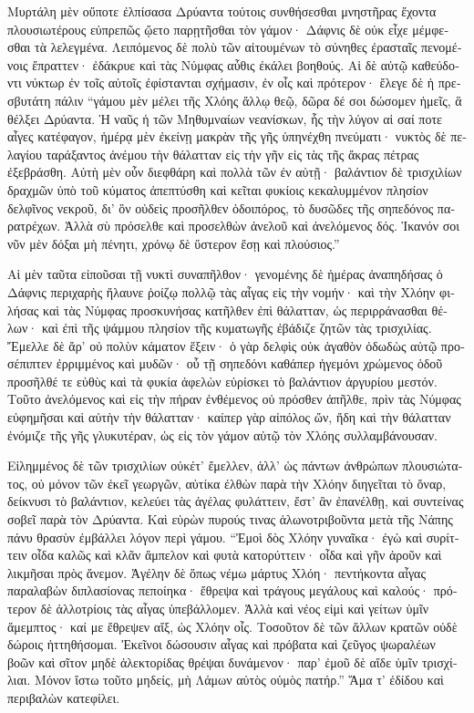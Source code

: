 \documentclass{book}
\begin{document}
\begin{pairs}
\begin{Leftside}
\begin{greek}
  Μυρτάλη μὲν οὔποτε ἐλπίσασα Δρύαντα τούτοις συνθήσεσθαι μνηστῆρας ἔχοντα πλουσιωτέρους εὐπρεπῶς ᾤετο παρῃτῆσθαι τὸν γάμον· Δάφνις δὲ οὐκ εἶχε μέμφεσθαι τὰ λελεγμένα. Λειπόμενος δὲ πολὺ τῶν αἰτουμένων τὸ σύνηθες ἐρασταῖς πενομένοις ἔπραττεν· ἐδάκρυε καὶ τὰς Νύμφας αὖθις ἐκάλει βοηθούς.  Αἱ δὲ αὐτῷ καθεύδοντι νύκτωρ ἐν τοῖς αὐτοῖς ἐφίστανται σχήμασιν, ἐν οἷς καὶ πρότερον· ἔλεγε δὲ ἡ πρεσβυτάτη πάλιν “γάμου μὲν μέλει τῆς Χλόης ἄλλῳ θεῷ, δῶρα δέ σοι δώσομεν ἡμεῖς, ἃ θέλξει Δρύαντα.  Ἡ ναῦς ἡ τῶν Μηθυμναίων νεανίσκων, ἧς τὴν λύγον αἱ σαί ποτε αἶγες κατέφαγον, ἡμέρᾳ μὲν ἐκείνῃ μακρὰν τῆς γῆς ὑπηνέχθη πνεύματι· νυκτὸς δὲ πελαγίου ταράξαντος ἀνέμου τὴν θάλατταν εἰς τὴν γῆν εἰς τὰς τῆς ἄκρας πέτρας ἐξεβράσθη.  Αὐτὴ μὲν οὖν διεφθάρη καὶ πολλὰ τῶν ἐν αὐτῇ· βαλάντιον δὲ τρισχιλίων δραχμῶν ὑπὸ τοῦ κύματος ἀπεπτύσθη καὶ κεῖται φυκίοις κεκαλυμμένον πλησίον δελφῖνος νεκροῦ, δι’ ὃν οὐδεὶς προσῆλθεν ὁδοιπόρος, τὸ δυσῶδες τῆς σηπεδόνος παρατρέχων.  Ἀλλὰ σὺ πρόσελθε καὶ προσελθὼν ἀνελοῦ καὶ ἀνελόμενος δός. Ἱκανόν σοι νῦν μὲν δόξαι μὴ πένητι, χρόνῳ δὲ ὕστερον ἔσῃ καὶ πλούσιος.”
\pend


  Αἱ μὲν ταῦτα εἰποῦσαι τῇ νυκτὶ συναπῆλθον· γενομένης δὲ ἡμέρας ἀναπηδήσας ὁ Δάφνις περιχαρὴς ἤλαυνε ῥοίζῳ πολλῷ τὰς αἶγας εἰς τὴν νομήν· καὶ τὴν Χλόην φιλήσας καὶ τὰς Νύμφας προσκυνήσας κατῆλθεν ἐπὶ θάλατταν, ὡς περιρράνασθαι θέλων· καὶ ἐπὶ τῆς ψάμμου πλησίον τῆς κυματωγῆς ἐβάδιζε ζητῶν τὰς τρισχιλίας.  Ἔμελλε δὲ ἄρ’ οὐ πολὺν κάματον ἕξειν· ὁ γὰρ δελφὶς οὐκ ἀγαθὸν ὀδωδὼς αὐτῷ προσέπιπτεν ἐρριμμένος καὶ μυδῶν· οὗ τῇ σηπεδόνι καθάπερ ἡγεμόνι χρώμενος ὁδοῦ προσῆλθέ τε εὐθὺς καὶ τὰ φυκία ἀφελὼν εὑρίσκει τὸ βαλάντιον ἀργυρίου μεστόν.  Τοῦτο ἀνελόμενος καὶ εἰς τὴν πήραν ἐνθέμενος οὐ πρόσθεν ἀπῆλθε, πρὶν τὰς Νύμφας εὐφημῆσαι καὶ αὐτὴν τὴν θάλατταν· καίπερ γὰρ αἰπόλος ὤν, ἤδη καὶ τὴν θάλατταν ἐνόμιζε τῆς γῆς γλυκυτέραν, ὡς εἰς τὸν γάμον αὐτῷ τὸν Χλόης συλλαμβάνουσαν.
\pend


  Εἰλημμένος δὲ τῶν τρισχιλίων οὐκέτ’ ἔμελλεν, ἀλλ’ ὡς πάντων ἀνθρώπων πλουσιώτατος, οὐ μόνον τῶν ἐκεῖ γεωργῶν, αὐτίκα ἐλθὼν παρὰ τὴν Χλόην διηγεῖται τὸ ὄναρ, δείκνυσι τὸ βαλάντιον, κελεύει τὰς ἀγέλας φυλάττειν, ἔστ’ ἂν ἐπανέλθῃ, καὶ συντείνας σοβεῖ παρὰ τὸν Δρύαντα. Καὶ εὑρὼν πυρούς τινας ἁλωνοτριβοῦντα μετὰ τῆς Νάπης πάνυ θρασὺν ἐμβάλλει λόγον περὶ γάμου.  “Ἐμοὶ δὸς Χλόην γυναῖκα· ἐγὼ καὶ συρίττειν οἶδα καλῶς καὶ κλᾶν ἄμπελον καὶ φυτὰ κατορύττειν· οἶδα καὶ γῆν ἀροῦν καὶ λικμῆσαι πρὸς ἄνεμον. Ἀγέλην δὲ ὅπως νέμω μάρτυς Χλόη· πεντήκοντα αἶγας παραλαβὼν διπλασίονας πεποίηκα· ἔθρεψα καὶ τράγους μεγάλους καὶ καλούς· πρότερον δὲ ἀλλοτρίοις τὰς αἶγας ὑπεβάλλομεν.  Ἀλλὰ καὶ νέος εἰμὶ καὶ γείτων ὑμῖν ἄμεμπτος· καί με ἔθρεψεν αἴξ, ὡς Χλόην οἶς. Τοσοῦτον δὲ τῶν ἄλλων κρατῶν οὐδὲ δώροις ἡττηθήσομαι.  Ἐκεῖνοι δώσουσιν αἶγας καὶ πρόβατα καὶ ζεῦγος ψωραλέων βοῶν καὶ σῖτον μηδὲ ἀλεκτορίδας θρέψαι δυνάμενον· παρ’ ἐμοῦ δὲ αἵδε ὑμῖν τρισχίλιαι. Μόνον ἴστω τοῦτο μηδείς, μὴ Λάμων αὐτὸς οὑμὸς πατήρ.” Ἅμα τ’ ἐδίδου καὶ περιβαλὼν κατεφίλει.
\pend



\end{greek}
\end{Leftside}
\end{pairs}
\end{document}
